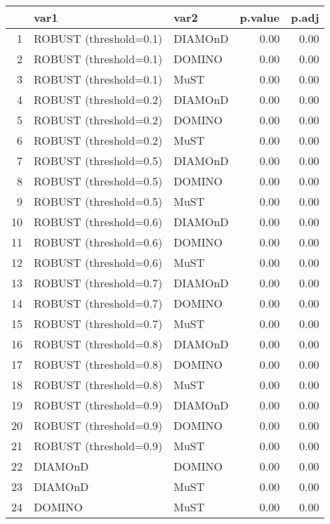 \begin{table}[ht]
\centering
\begin{tabular}{rllrr}
  \hline
 & var1 & var2 & p.value & p.adj \\ 
  \hline
1 & ROBUST (threshold=0.1) & DIAMOnD & 0.00 & 0.00 \\ 
  2 & ROBUST (threshold=0.1) & DOMINO & 0.00 & 0.00 \\ 
  3 & ROBUST (threshold=0.1) & MuST & 0.00 & 0.00 \\ 
  4 & ROBUST (threshold=0.2) & DIAMOnD & 0.00 & 0.00 \\ 
  5 & ROBUST (threshold=0.2) & DOMINO & 0.00 & 0.00 \\ 
  6 & ROBUST (threshold=0.2) & MuST & 0.00 & 0.00 \\ 
  7 & ROBUST (threshold=0.5) & DIAMOnD & 0.00 & 0.00 \\ 
  8 & ROBUST (threshold=0.5) & DOMINO & 0.00 & 0.00 \\ 
  9 & ROBUST (threshold=0.5) & MuST & 0.00 & 0.00 \\ 
  10 & ROBUST (threshold=0.6) & DIAMOnD & 0.00 & 0.00 \\ 
  11 & ROBUST (threshold=0.6) & DOMINO & 0.00 & 0.00 \\ 
  12 & ROBUST (threshold=0.6) & MuST & 0.00 & 0.00 \\ 
  13 & ROBUST (threshold=0.7) & DIAMOnD & 0.00 & 0.00 \\ 
  14 & ROBUST (threshold=0.7) & DOMINO & 0.00 & 0.00 \\ 
  15 & ROBUST (threshold=0.7) & MuST & 0.00 & 0.00 \\ 
  16 & ROBUST (threshold=0.8) & DIAMOnD & 0.00 & 0.00 \\ 
  17 & ROBUST (threshold=0.8) & DOMINO & 0.00 & 0.00 \\ 
  18 & ROBUST (threshold=0.8) & MuST & 0.00 & 0.00 \\ 
  19 & ROBUST (threshold=0.9) & DIAMOnD & 0.00 & 0.00 \\ 
  20 & ROBUST (threshold=0.9) & DOMINO & 0.00 & 0.00 \\ 
  21 & ROBUST (threshold=0.9) & MuST & 0.00 & 0.00 \\ 
  22 & DIAMOnD & DOMINO & 0.00 & 0.00 \\ 
  23 & DIAMOnD & MuST & 0.00 & 0.00 \\ 
  24 & DOMINO & MuST & 0.00 & 0.00 \\ 
   \hline
\end{tabular}
\end{table}
